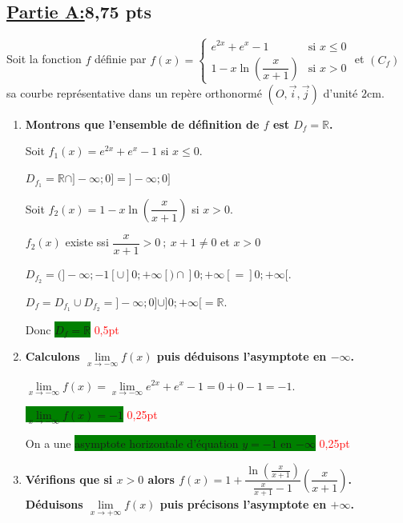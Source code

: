 \documentclass[12pt,a4paper]{article}
\begin{document}
\newpage

\subsection*{\underline{Partie A:}\quad\textbf{8,75 pts}}

Soit la fonction $f$ définie par $f(x) = \begin{cases} e^{2x} + e^x - 1 & \text{si } x \le 0 \\ 1 - x\ln\left(\dfrac{x}{x+1}\right) & \text{si } x > 0 \end{cases}$ et $(C_f)$ sa courbe représentative dans un repère orthonormé $(O, \vec{i}, \vec{j})$ d'unité $2\text{cm}$.

\begin{enumerate}
    \item \textbf{Montrons que l'ensemble de définition de $f$ est $D_f = \mathbb{R}$.}
    
    Soit $f_1(x) = e^{2x} + e^x - 1$ si $x \le 0$. 
    
    $D_{f_1} = \mathbb{R} \cap ]-\infty ; 0] = ]-\infty ; 0]$
    
    Soit $f_2(x) = 1 - x\ln\left(\dfrac{x}{x+1}\right)$ si $x > 0$. 
    
    $f_2(x)$ existe ssi $\dfrac{x}{x+1} > 0 \ ; \ x + 1 \neq 0$ et $x > 0$
    
    $D_{f_2} = ( ]-\infty ; -1[ \cup ]0 ; +\infty[ ) \cap ]0 ; +\infty[ = ]0 ; +\infty[$.
    
    $D_f = D_{f_1} \cup D_{f_2} = ]-\infty ; 0] \cup ]0 ; +\infty[ = \mathbb{R}$. 
    
    Donc \colorbox{green}{$D_f = \mathbb{R}$} \hfill \textcolor{red}{0,5pt}

    \item \textbf{Calculons $\lim\limits_{x \to -\infty} f(x)$ puis déduisons l'asymptote en $-\infty$.}
    
    $\lim\limits_{x \to -\infty} f(x) = \lim\limits_{x \to -\infty} e^{2x} + e^x - 1 = 0 + 0 - 1 = -1$.
    
     \colorbox{green}{$\lim\limits_{x \to -\infty} f(x) = -1$} \hfill \textcolor{red}{0,25pt}
    
    On a une \colorbox{green}{asymptote horizontale d'équation $y = -1$ en $-\infty$} \hfill \textcolor{red}{0,25pt}

    \item \textbf{Vérifions que si $x > 0$ alors $f(x) = 1 + \dfrac{\ln\left(\frac{x}{x+1}\right)}{\frac{x}{x+1}-1}\left(\dfrac{x}{x+1}\right)$. Déduisons $\lim\limits_{x \to +\infty} f(x)$ puis précisons l'asymptote en $+\infty$.}
    

\end{enumerate}
\end{document}
